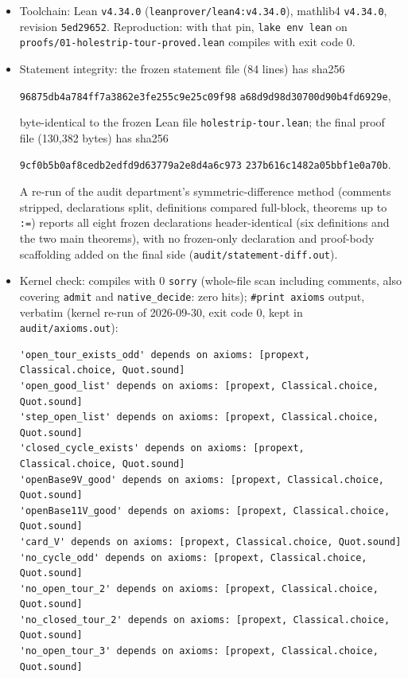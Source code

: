 \documentclass[11pt]{article}
\begin{document}
\begin{itemize}
\item Toolchain: Lean \texttt{v4.34.0} (\texttt{leanprover/lean4:v4.34.0}),
mathlib4 \texttt{v4.34.0}, revision \texttt{5ed29652}. Reproduction: with
that pin, \texttt{lake env lean} on
\texttt{proofs/01-holestrip-tour-proved.lean} compiles with exit code $0$.
\item Statement integrity: the frozen statement file (84 lines) has sha256
\begin{center}
\texttt{96875db4a784ff7a3862e3fe255c9e25c09f98}\allowbreak
\texttt{a68d9d98d30700d90b4fd6929e},
\end{center}
byte-identical to the frozen Lean file \texttt{holestrip-tour.lean}; the
final proof file (130{,}382 bytes) has sha256
\begin{center}
\texttt{9cf0b5b0af8cedb2edfd9d63779a2e8d4a6c973}\allowbreak
\texttt{237b616c1482a05bbf1e0a70b}.
\end{center}
A re-run of the audit department's symmetric-difference method (comments
stripped, declarations split, definitions compared full-block, theorems up
to \texttt{:=}) reports all eight frozen declarations header-identical
(six definitions and the two main theorems), with no frozen-only
declaration and proof-body scaffolding added on the final side
(\texttt{audit/statement-diff.out}).
\item Kernel check: compiles with $0$ \texttt{sorry} (whole-file scan
including comments, also covering \texttt{admit} and \texttt{native\_decide}:
zero hits); \texttt{\#print axioms} output, verbatim (kernel re-run of
2026-09-30, exit code 0, kept in \texttt{audit/axioms.out}):
\begin{lstlisting}[basicstyle=\ttfamily\footnotesize,frame=none]
'open_tour_exists_odd' depends on axioms: [propext, Classical.choice, Quot.sound]
'open_good_list' depends on axioms: [propext, Classical.choice, Quot.sound]
'step_open_list' depends on axioms: [propext, Classical.choice, Quot.sound]
'closed_cycle_exists' depends on axioms: [propext, Classical.choice, Quot.sound]
'openBase9V_good' depends on axioms: [propext, Classical.choice, Quot.sound]
'openBase11V_good' depends on axioms: [propext, Classical.choice, Quot.sound]
'card_V' depends on axioms: [propext, Classical.choice, Quot.sound]
'no_cycle_odd' depends on axioms: [propext, Classical.choice, Quot.sound]
'no_open_tour_2' depends on axioms: [propext, Classical.choice, Quot.sound]
'no_closed_tour_2' depends on axioms: [propext, Classical.choice, Quot.sound]
'no_open_tour_3' depends on axioms: [propext, Classical.choice, Quot.sound]

\end{lstlisting}
\end{itemize}
\end{document}
